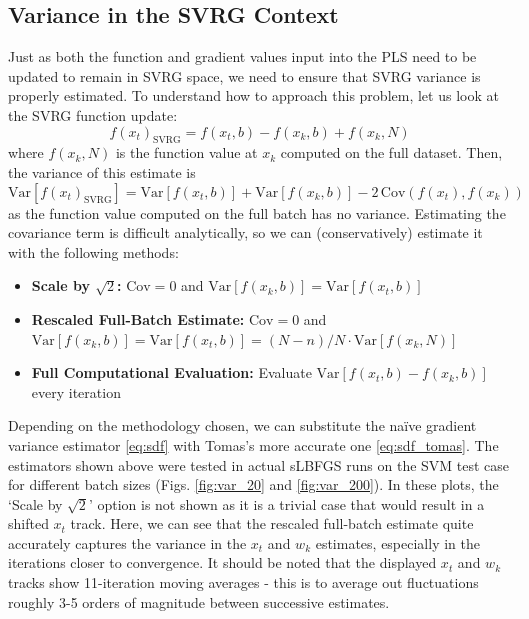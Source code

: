 \documentclass{article}
\begin{document}
\subsection{Variance in the SVRG Context}
Just as both the function and gradient values input into the PLS need to be updated to remain in SVRG space, we need to ensure that SVRG variance is properly estimated. To understand how to approach this problem, let us look at the SVRG function update:
\[ f(x_t)_{\text{SVRG}} = f(x_t, b) - f(x_k, b) + f(x_k, N) \]
where $f(x_k, N)$ is the function value at $x_k$ computed on the full dataset. Then, the variance of this estimate is
\begin{equation}
\label{eq:svrg_var}
\text{Var}[f(x_t)_{\text{SVRG}}] = \text{Var}[f(x_t,b)] + \text{Var}[f(x_k, b)] - 2\,\text{Cov}(f(x_t),f(x_k))
\end{equation}
as the function value computed on the full batch has no variance. Estimating the covariance term is difficult analytically, so we can (conservatively) estimate it with the following methods:
\begin{itemize}
	\item \textbf{Scale by $\sqrt{2}$:} $\text{Cov}=0$ and $\text{Var}[f(x_k, b)]=\text{Var}[f(x_t, b)]$
	\item \textbf{Rescaled Full-Batch Estimate:} $\text{Cov}=0$ and $\text{Var}[f(x_k, b)]=\text{Var}[f(x_t, b)] = (N-n)/N\cdot\text{Var}[f(x_k, N)]$
	\item \textbf{Full Computational Evaluation:} Evaluate $\text{Var}[f(x_t, b) - f(x_k,b)]$ every iteration
\end{itemize}
Depending on the methodology chosen, we can substitute the naïve gradient variance estimator \eqref{eq:sdf} with Tomas's more accurate one \eqref{eq:sdf_tomas}. The estimators shown above were tested in actual sLBFGS runs on the SVM test case for different batch sizes (Figs. \ref{fig:var_20} and \ref{fig:var_200}). In these plots, the `Scale by $\sqrt{2}$' option is not shown as it is a trivial case that would result in a shifted $x_t$ track. Here, we can see that the rescaled full-batch estimate quite accurately captures the variance in the $x_t$ and $w_k$ estimates, especially in the iterations closer to convergence. It should be noted that the displayed $x_t$ and $w_k$ tracks show 11-iteration moving averages - this is to average out fluctuations roughly 3-5 orders of magnitude between successive estimates.
\end{document}
